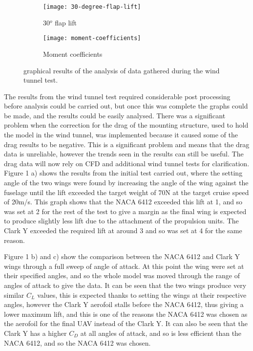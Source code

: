 \documentclass[../../main.tex]{subfiles}
\begin{document}
\begin{figure}[H]
    \begin{subfigure}[b]{0.49\columnwidth}
        \centering
        \texttt{[image: 30-degree-flap-lift]}
        \caption{30$^o$ flap lift}
        \label{fig:wind-tunnel-results:30-degree-flap-lift}
    \end{subfigure}
    \hfill
    \begin{subfigure}[b]{0.49\columnwidth}
        \centering
        \texttt{[image: moment-coefficients]}
        \caption{Moment coefficients}
        \label{fig:wind-tunnel-results:moment-coefficients}
    \end{subfigure}

    \caption{graphical results of the analysis of data gathered during the wind tunnel test.}
    \label{fig:wind-tunnel-results}
\end{figure}

The results from the wind tunnel test required considerable post processing before analysis could be carried out, but once this was complete the graphs could be made, and the results could be easily analysed.
There was a significant problem when the correction for the drag of the mounting structure, used to hold the model in the wind tunnel, was implemented because it caused some of the drag results to be negative.
This is a significant problem and means that the drag data is unreliable, however the trends seen in the results can still be useful.
The drag data will now rely on CFD and additional wind tunnel tests for clarification.
Figure 1 a) shows the results from the initial test carried out, where the setting angle of the two wings were found by increasing the angle of the wing against the fuselage until the lift exceeded the target weight of 70N at the target cruise speed of 20m/s.
This graph shows that the NACA 6412 exceeded this lift at 1, and so was set at 2 for the rest of the test to give a margin as the final wing is expected to produce slightly less lift due to the attachment of the propulsion units.
The Clark Y exceeded the required lift at around 3 and so was set at 4 for the same reason. 

Figure 1 b) and c) show the comparison between the NACA 6412 and Clark Y wings through a full sweep of angle of attack.
At this point the wing were set at their specified angles, and so the whole model was moved through the range of angles of attack to give the data.
It can be seen that the two wings produce very similar $C_L$ values, this is expected thanks to setting the wings at their respective angles, however the Clark Y aerofoil stalls before the NACA 6412, thus giving a lower maximum lift, and this is one of the reasons the NACA 6412 was chosen as the aerofoil for the final UAV instead of the Clark Y.
It can also be seen that the Clark Y has a higher $C_D$ at all angles of attack, and so is less efficient than the NACA 6412, and so the NACA 6412 was chosen. 
\end{document}
